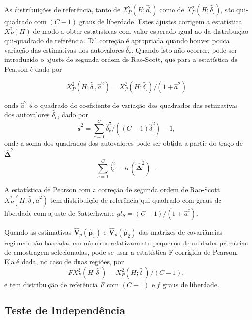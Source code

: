\documentclass[]{book}
\numberwithin{example}{chapter}
\numberwithin{remark}{chapter}
\numberwithin{definition}{chapter}
\begin{document}
As distribuições de referência, tanto de
\(X_{P}^{2}\left( H;\hat{ d}_{\cdot }\right)\) como de
\(X_{P}^{2}\left( H;\hat{\delta}_{.}\right)\), são qui-quadrado com
\(\left( C-1\right)\) graus de liberdade. Estes ajustes corrigem a
estatística \(X_{P}^{2}\left( H\right)\) de modo a obter estatísticas
com valor esperado igual ao da distribuição qui-quadrado de referência.
Tal correção é apropriada quando houver pouca variação das estimativas
dos autovalores \(\hat{\delta} _{c}\). Quando isto não ocorrer, pode ser
introduzido o ajuste de segunda ordem de Rao-Scott, que para a
estatística de Pearson é dado por

\begin{equation}
X_{P}^{2}\left( H;\hat{\delta}_{.},\hat{a}^{2}\right) =X_{P}^{2}\left( H;
\hat{\delta}_{.}\right) /\left( 1+\hat{a}^{2}\right)  \label{eq:Tab9}
\end{equation}

onde \(\hat{a}^{2}\) é o quadrado do coeficiente de variação dos
quadrados das estimativas dos autovalores \(\hat{\delta}_{c}\), dado por
\[
\hat{a}^{2}=\sum\limits_{c=1}^{C}\hat{\delta}_{c}^{2}/\left( \left(
C-1\right) \hat{\delta}_{.}^{2}\right) -1,
\] onde a soma dos quadrados dos autovalores pode ser obtida a partir do
traço de \(\mathbf{\hat{\Delta}}^{2}\) \[
\sum\limits_{c=1}^{C}\hat{\delta}_{c}^{2}=tr\left( \mathbf{\hat{\Delta}}
^{2}\right) \;\;. 
\]

A estatística de Pearson com a correção de segunda ordem de Rao-Scott
\(X_{P}^{2}\left( H;\hat{\delta}_{.},\hat{a}^{2}\right)\) tem
distribuição de referência qui-quadrado com graus de liberdade com
ajuste de Satterhwaite
\(gl_{S}=\left( C-1\right) /\left( 1+\hat{a} ^{2}\right)\).

Quando as estimativas
\(\mathbf{\hat{V}}_{p}\left( \widehat{\mathbf{p}} _{1}\right)\) e
\(\mathbf{\hat{V}}_{p}\left( \widehat{\mathbf{p}}_{2}\right)\) das
matrizes de covariâncias regionais são baseadas em números relativamente
pequenos de unidades primárias de amostragem selecionadas, pode-se usar
a estatística F-corrigida de Pearson. Ela é dada, no caso de duas
regiões, por \[
FX_{P}^{2}\left( H;\hat{\delta}_{.}\right) =X_{P}^{2}\left( H;\hat{\delta}
_{.}\right) /\left( C-1\right),
\] e tem distribuição de referência \emph{F} com \(\left(C-1\right)\) e
\(f\) graus de liberdade.

\subsection{Teste de Independência}\label{teste-de-independencia-1}
\end{document}
